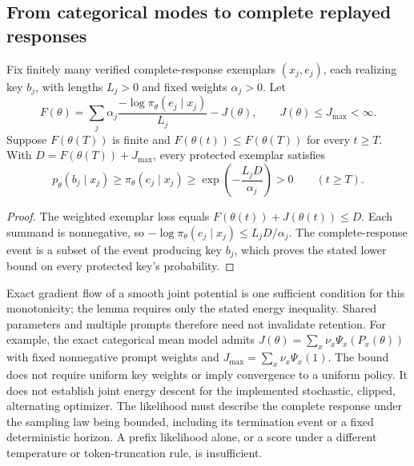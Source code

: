 \subsection{From categorical modes to complete replayed responses}
\label{app:theory-exemplar-bridge}

\begin{lemma}
\label{lem:shared-exemplar-retention}
Fix finitely many verified complete-response exemplars $(x_j,e_j)$, each
realizing key $b_j$, with lengths $L_j>0$ and fixed weights $\alpha_j>0$.
Let
\[
 F(\theta)=\sum_j\alpha_j
 \frac{-\log\pi_\theta(e_j\mid x_j)}{L_j}-J(\theta),
 \qquad J(\theta)\le J_{\max}<\infty.
\]
Suppose $F(\theta(T))$ is finite and
$F(\theta(t))\le F(\theta(T))$ for every $t\ge T$. With
$D=F(\theta(T))+J_{\max}$, every protected exemplar satisfies
\[
 p_\theta(b_j\mid x_j)\ge\pi_\theta(e_j\mid x_j)
 \ge\exp\!\left(-\frac{L_jD}{\alpha_j}\right)>0
 \qquad(t\ge T).
\]
\end{lemma}
\begin{proof}
The weighted exemplar loss equals $F(\theta(t))+J(\theta(t))\le D$.
Each summand is nonnegative, so
$-\log\pi_\theta(e_j\mid x_j)\le L_jD/\alpha_j$.
The complete-response event is a subset of the event producing key $b_j$,
which proves the stated lower bound on every protected key's probability.
\end{proof}

Exact gradient flow of a smooth joint potential is one sufficient condition
for this monotonicity; the lemma requires only the stated energy inequality.
Shared parameters and multiple prompts therefore need not invalidate
retention. For example, the exact categorical mean model admits
$J(\theta)=\sum_x\nu_x\Psi_x(P_x(\theta))$ with fixed nonnegative prompt
weights and $J_{\max}=\sum_x\nu_x\Psi_x(1)$. The bound does not require
uniform key weights or imply convergence to a uniform policy. It does not
establish joint energy descent for the implemented stochastic, clipped,
alternating optimizer. The likelihood must describe the complete response
under the sampling law being bounded, including its termination event or a
fixed deterministic horizon. A prefix likelihood alone, or a score under a
different temperature or token-truncation rule, is insufficient.

